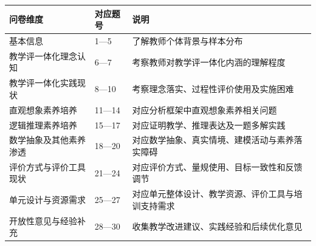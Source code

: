 \documentclass[UTF8,a4paper,12pt,twoside]{ctexart}
\begin{document}
\begin{tabular}{|p{}|p{}|p{}|}
\hline
问卷维度&对应题号&说明\\
\hline
基本信息&1—5&了解教师个体背景与样本分布\\
\hline
教学评一体化理念认知&6—7&考察教师对教学评一体化内涵的理解程度\\
\hline
教学评一体化实践现状&8—10&考察理念落实、过程性评价使用及实施困难\\
\hline
直观想象素养培养&11—14&对应分析框架中直观想象素养相关问题\\
\hline
逻辑推理素养培养&15—17&对应证明教学、推理表达及一题多解实践\\
\hline
数学抽象及其他素养渗透&18—20&对应数学抽象、真实情境、建模活动与素养落实障碍\\
\hline
评价方式与评价工具现状&21—24&对应评价方式、量规使用、目标一致性和反馈调节\\
\hline
单元设计与资源需求&25—27&对应单元整体设计、教学资源、评价工具与培训支持需求\\
\hline
开放性意见与经验补充&28—30&收集教学改进建议、实践经验和后续优化意见\\
\hline
\end{tabular}
\end{document}

